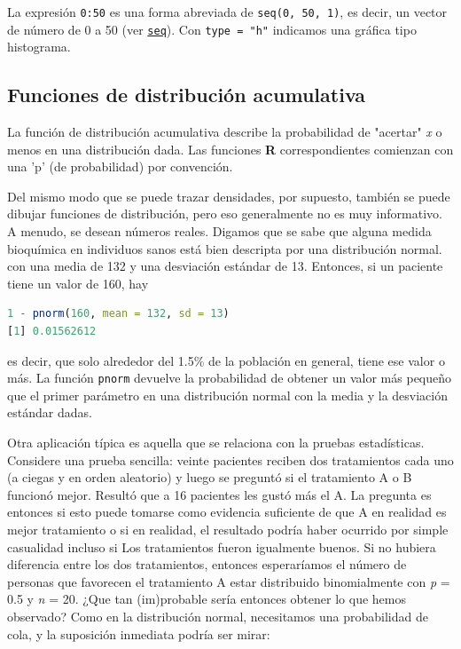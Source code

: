La expresión \texttt{0:50} es una forma abreviada de \texttt{seq(0, 50, 1)}, es
decir, un vector de número de 0 a 50 (ver \hyperlink{seq}{\texttt{seq}}). Con
\texttt{type  = "h"} indicamos una gráfica tipo histograma.


\subsection{Funciones de distribución acumulativa}

La función de distribución acumulativa describe la probabilidad de "acertar"
\textit{x} o menos en una distribución dada. Las funciones \textbf{R}
correspondientes comienzan con una 'p' (de probabilidad) por convención.

Del mismo modo que se puede trazar densidades, por supuesto, también se puede
dibujar funciones de distribución, pero eso generalmente no es muy informativo.
A menudo, se desean números reales. Digamos que se sabe que alguna medida
bioquímica en individuos sanos está bien descripta por una distribución normal.
con una media de 132 y una desviación estándar de 13. Entonces, si un paciente
tiene un valor de 160, hay


\begin{lstlisting}[language=R]
1 - pnorm(160, mean = 132, sd = 13)
[1] 0.01562612
\end{lstlisting}

es decir, que solo alrededor del 1.5\% de la población en general, tiene ese
valor o más. La función \texttt{pnorm} devuelve la probabilidad de obtener un
valor más pequeño que el primer parámetro en una distribución normal con la
media y la desviación estándar dadas.

Otra aplicación típica es aquella que se relaciona con la pruebas estadísticas.
Considere una prueba sencilla: veinte pacientes reciben dos tratamientos cada
uno (a ciegas y en orden aleatorio) y luego se preguntó si el tratamiento A o B
funcionó mejor. Resultó que a 16 pacientes les gustó más el A. La pregunta es
entonces si esto puede tomarse como evidencia suficiente de que A en realidad es
mejor tratamiento o si en realidad, el resultado podría haber ocurrido por
simple casualidad incluso si Los tratamientos fueron igualmente buenos. Si no
hubiera diferencia entre los dos tratamientos, entonces esperaríamos el número
de personas que favorecen el tratamiento A estar distribuido binomialmente con
\textit{p} = 0.5 y \textit{n} = 20. ¿Que tan (im)probable sería entonces obtener
lo que hemos observado? Como en la distribución normal, necesitamos una
probabilidad de cola, y la suposición inmediata podría ser mirar:


